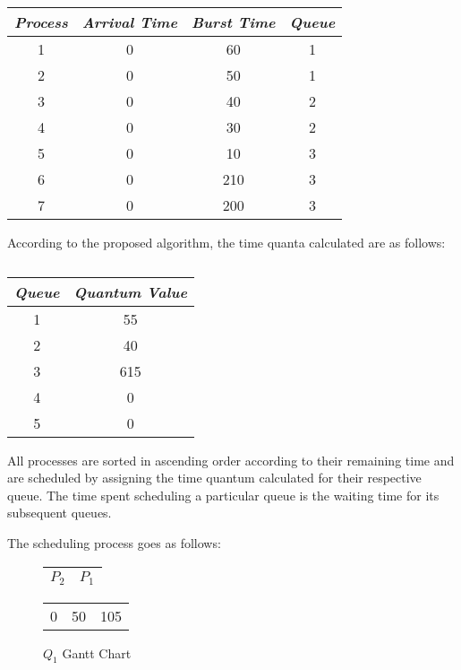 \documentclass[conference]{IEEEtran}
\newcommand\T{\rule{0pt}{2.6ex}}       %
\newcommand\B{\rule[-1.2ex]{0pt}{0pt}} %
\begin{document}
\begin{table}[H]
    \caption{}
    \centering
     \begin{tabular}{||c c c c||} 
     \hline
     \textit{\textbf{Process}} & \textit{\textbf{Arrival Time}} & \textit{\textbf{Burst Time}} & \textit{\textbf{Queue}} \T \B \\ 
     \hline
     \hline
     1 & 0 & 60 & 1 \T \B \\ 
     \hline
     2 & 0 & 50 & 1 \T \B \\
     \hline
     3 & 0 & 40 & 2 \T \B \\
     \hline
     4 & 0 & 30 & 2 \T \B \\
     \hline
     5 & 0 & 10 & 3 \T \B \\ 
     \hline
     6 & 0 & 210 & 3 \T \B \\ 
     \hline
     7 & 0 & 200 & 3 \T \B \\ 
     \hline
     \end{tabular}
     \label{table1}
\end{table}

According to the proposed algorithm, the time quanta calculated are as follows:

\begin{table}[H]
    \caption{}
    \centering
     \begin{tabular}{||c c||} 
     \hline
     \textit{\textbf{Queue}} & \textit{\textbf{Quantum Value}} \T \B \\ 
     \hline
     \hline
     1 & 55 \T \B \\ 
     \hline
     2 & 40 \T \B \\
     \hline
     3 & 615 \T \B \\
     \hline
     4 & 0 \T \B \\
     \hline
     5 & 0 \T \B \\ 
     \hline
     \end{tabular}
\end{table}

All processes are sorted in ascending order according to their remaining time and are scheduled by assigning the time quantum calculated for their respective queue. The time spent scheduling a particular queue is the waiting time for its subsequent queues.

The scheduling process goes as follows:

\begin{figure}[H]
        \begin{center}
        \begin{tabular}{|c|c|}
         \hline
            $P_{2}$ & $P_{1}$\T\B\\ 
         \hline
        \end{tabular}
        \end{center}
        \begin{center}
            \begin{tabular}{c c c}
                   0 & 50 & 105\\ 
            \end{tabular}
        \end{center}
    \caption{$Q_{1}$ Gantt Chart}
\end{figure}
\end{document}
